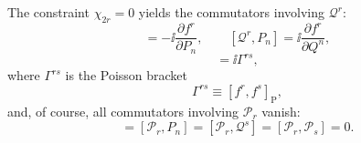 The constraint $\chi_{2r}=0$ yields the commutators involving
$\mathcal{Q}^r$:
\begin{equation}
  [\mathcal{Q}^r,Q^n]=-\ii\frac{\partial f^r}{\partial P_n},\qquad
  [\mathcal{Q}^r,P_n]=\ii\frac{\partial f^r}{\partial Q^n},
  \tag{7.A.4}\label{eq:7.A.4}
\end{equation}
\begin{equation}
  [\mathcal{Q}^r,\mathcal{Q}^s]=\ii\Gamma^{rs},
  \tag{7.A.5}\label{eq:7.A.5}
\end{equation}
where $\Gamma^{rs}$ is the Poisson bracket
\begin{equation}
  \Gamma^{rs}\equiv[f^r,f^s]_{\mathrm P},
  \tag{7.A.6}\label{eq:7.A.6}
\end{equation}
and, of course, all commutators involving $\mathcal{P}_r$ vanish:
\begin{equation}
  [\mathcal{P}_r,Q^n]=[\mathcal{P}_r,P_n]
  =[\mathcal{P}_r,\mathcal{Q}^s]=[\mathcal{P}_r,\mathcal{P}_s]=0.
  \tag{7.A.7}\label{eq:7.A.7}
\end{equation}

